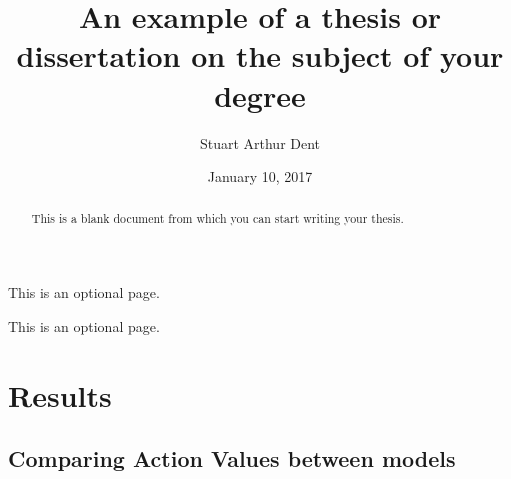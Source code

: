 \documentclass{sfuthesis}
\title{An example of a thesis or dissertation on the subject of your degree}
\author{Stuart Arthur Dent}
\date{January 10, 2017}
\begin{document}
\frontmatter
\maketitle{}
\makecommittee{}

\begin{abstract}
	This is a blank document from which you can start writing your thesis.
\end{abstract}


\begin{dedication}
	This is an optional page.
\end{dedication}


\begin{acknowledgements}
	This is an optional page.
\end{acknowledgements}

%
\tableofcontents%
\clearpage

%
\listoftables%
\clearpage

%
\listoffigures%
\clearpage





%
%

\mainmatter%



\chapter{Results}

\section{Comparing Action Values between models}
\end{document}
